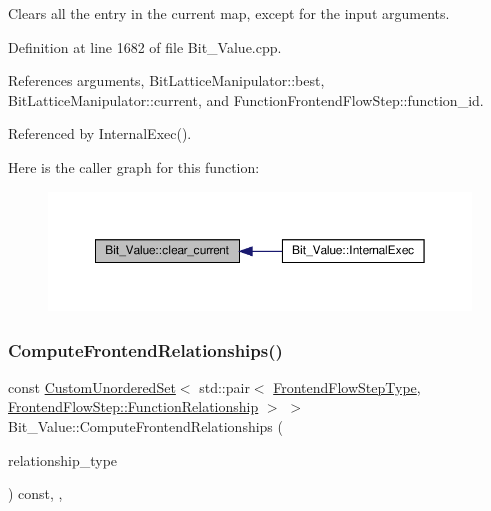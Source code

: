Clears all the entry in the current map, except for the input arguments. 



Definition at line 1682 of file Bit\+\_\+\+Value.\+cpp.



References arguments, Bit\+Lattice\+Manipulator\+::best, Bit\+Lattice\+Manipulator\+::current, and Function\+Frontend\+Flow\+Step\+::function\+\_\+id.



Referenced by Internal\+Exec().

Here is the caller graph for this function\+:
\nopagebreak
\begin{figure}[H]
\begin{center}
\leavevmode
\includegraphics[width=350pt]{df/d4b/classBit__Value_a03e2a690b6edfac4100e93554c43629c_icgraph}
\end{center}
\end{figure}
\mbox{\label{classBit__Value_afd25b019269ed85825562c64edf120ed}} 
\subsubsection{\texorpdfstring{Compute\+Frontend\+Relationships()}{ComputeFrontendRelationships()}}
{\footnotesize\ttfamily const \hyperlink{classCustomUnorderedSet}{Custom\+Unordered\+Set}$<$ std\+::pair$<$ \hyperlink{frontend__flow__step_8hpp_afeb3716c693d2b2e4ed3e6d04c3b63bb}{Frontend\+Flow\+Step\+Type}, \hyperlink{classFrontendFlowStep_af7cf30f2023e5b99e637dc2058289ab0}{Frontend\+Flow\+Step\+::\+Function\+Relationship} $>$ $>$ Bit\+\_\+\+Value\+::\+Compute\+Frontend\+Relationships (\begin{DoxyParamCaption}\item[{const \hyperlink{classDesignFlowStep_a723a3baf19ff2ceb77bc13e099d0b1b7}{Design\+Flow\+Step\+::\+Relationship\+Type}}]{relationship\+\_\+type }\end{DoxyParamCaption}) const\hspace{0.3cm}{\ttfamily [override]}, {\ttfamily [private]}, {\ttfamily [virtual]}}



